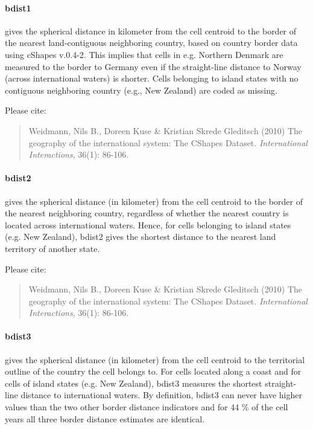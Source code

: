 \documentclass[]{book}
\begin{document}
\paragraph{bdist1}\label{bdist1}

gives the spherical distance in kilometer from the cell centroid to the
border of the nearest land-contiguous neighboring country, based on
country border data using cShapes v.0.4-2. This implies that cells in
e.g. Northern Denmark are measured to the border to Germany even if the
straight-line distance to Norway (across international waters) is
shorter. Cells belonging to island states with no contiguous neighboring
country (e.g., New Zealand) are coded as missing.

Please cite:

\begin{quote}
Weidmann, Nils B., Doreen Kuse \& Kristian Skrede Gleditsch (2010) The
geography of the international system: The CShapes Dataset.
\emph{International Interactions}, 36(1): 86-106.
\end{quote}

\paragraph{bdist2}\label{bdist2}

gives the spherical distance (in kilometer) from the cell centroid to
the border of the nearest neighboring country, regardless of whether the
nearest country is located across international waters. Hence, for cells
belonging to island states (e.g. New Zealand), bdist2 gives the shortest
distance to the nearest land territory of another state.

Please cite:

\begin{quote}
Weidmann, Nils B., Doreen Kuse \& Kristian Skrede Gleditsch (2010) The
geography of the international system: The CShapes Dataset.
\emph{International Interactions}, 36(1): 86-106.
\end{quote}

\paragraph{bdist3}\label{bdist3}

gives the spherical distance (in kilometer) from the cell centroid to
the territorial outline of the country the cell belongs to. For cells
located along a coast and for cells of island states (e.g. New Zealand),
bdist3 measures the shortest straight-line distance to international
waters. By definition, bdist3 can never have higher values than the two
other border distance indicators and for 44 \% of the cell years all
three border distance estimates are identical.
\end{document}
